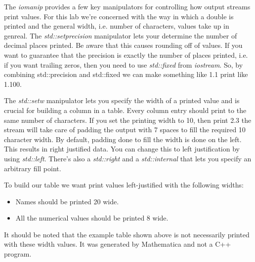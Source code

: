 \documentclass[]{tufte-handout}
\begin{document}
The \textit{iomanip} provides a few key manipulators for controlling how output streams print values. For this lab we're concerned with the way in which a double is printed and the general width, i.e. number of characters, values take up in genreal. The \textit{std::setprecision} manipulator lets your determine the number of decimal places printed. Be aware that this causes rounding off of values.  If you want to guarantee that the precision is exactly the number of places printed, i.e. if you want trailing zeros, then you need to use \textit{std::fixed} from \textit{iostream}.  So, by combining std::precision and std::fixed we can make something like 1.1 print like 1.100. 


The \textit{std::setw}  manipulator lets you specify the width of a printed value and is crucial for building a column in a table. Every column entry should print to the same number of characters. If you set the printing width to 10, then print 2.3 the stream will take care of padding the output with 7 spaces to fill the required 10 character width. By default, padding done to fill the width is done on the left. This results in right justified data. You can change this to left justification by using \textit{std::left}. There's also a \textit{std::right} and a \textit{std::internal} that lets you specify an arbitrary fill point.

To build our table we want print values left-justified with the following widths: 
\begin{itemize}
\item Names should be printed 20 wide.
\item All the numerical values should be printed 8 wide.
\end{itemize}
It should be noted that the example table shown above is not necessarily printed with these width values. It was generated by Mathematica and not a C++ program.  
\end{document}
